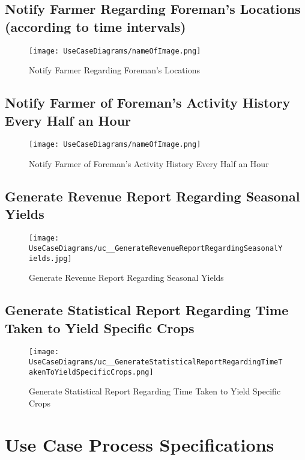 \documentclass[11pt,fleqn]{book} %
\begin{document}
	\section{Notify Farmer Regarding Foreman’s Locations (according to time intervals)}
	\begin{figure}
		\texttt{[image: UseCaseDiagrams/nameOfImage.png]}
		\caption{Notify Farmer Regarding Foreman’s Locations}
	\end{figure}
	
	\section{Notify Farmer of Foreman’s Activity History Every Half an Hour}
	\begin{figure}
		\texttt{[image: UseCaseDiagrams/nameOfImage.png]}
		\caption{Notify Farmer of Foreman’s Activity History Every Half an Hour}
	\end{figure}
	
	\clearpage
	\section{Generate Revenue Report Regarding Seasonal Yields}
	\begin{figure}
		\texttt{[image: UseCaseDiagrams/uc\_\_GenerateRevenueReportRegardingSeasonalYields.jpg]}
		\caption{Generate Revenue Report Regarding Seasonal Yields}
	\end{figure}
	
	\section{Generate Statistical Report Regarding Time Taken to Yield Specific Crops}
	\begin{figure}
		\texttt{[image: UseCaseDiagrams/uc\_\_GenerateStatisticalReportRegardingTimeTakenToYieldSpecificCrops.png]}
		\caption{Generate Statistical Report Regarding Time Taken to Yield Specific Crops}
	\end{figure}



\chapter{Use Case Process Specifications} %
\end{document}
